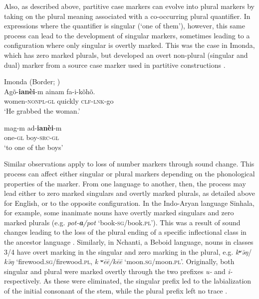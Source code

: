 \documentclass[output=paper]{langsci/langscibook}
\begin{document}
Also, as described above, partitive case markers can evolve into plural markers by
taking on the plural meaning associated with a co-occurring plural
quantifier. In expressions where the quantifier is singular (`one of
them'), however, this same process can lead to the development of
singular markers, sometimes leading to a configuration where only singular
is overtly marked. This was the case in Imonda, which has zero marked plurals, but developed
an overt non-plural
(singular and dual) marker
 from a source case marker used in partitive constructions .

\ea\label{imonda2}
Imonda (Border; )\\
\ea
\gll Agõ-\textbf{{ianèi}}-m ainam fa-i-kõhõ.\\
women-\textsc{nonpl-gl} quickly \textsc{clf-lnk}-go\\
\glt `He grabbed the woman.' 

\ex
\gll mag-m ad-\textbf{{ianèi}}-m \\
one-\textsc{gl} boy-\textsc{src-gl} \\
\glt `to one of the boys'


\z
\z


Similar observations apply to loss of number markers through sound
change. This process can affect
either singular or plural markers depending on the phonological
properties of the marker. From one language to another, then, the process may lead either to  zero marked singulars and
overtly marked plurals, as detailed above for
English, or to the opposite configuration. In the
Indo-Aryan language Sinhala,  for example, some inanimate nouns have
overtly marked singulars and
zero marked plurals
 (e.g. {\em pot-\textbf{\textit {a}}/pot} `book-\textsc{sg}/book.\textsc{pl}'). This was a result of
 sound changes leading to the loss of the plural ending of a specific inflectional class in the ancestor language
 \citep[250--256]{NitzNordhoff2010}. Similarly, in Nchanti, a Beboid
 language, nouns in classes 3/4 have overt
  marking in the singular and zero marking in the plural, e.g. {\em
    k{\bf ʷ}\=əŋ}/{\em
    k\=əŋ} `firewood.\textsc{sg}/firewood.\textsc{pl}, {\em k{\bf
      ʷ}ēē/kēē} `moon.\textsc{sg}/moon.\textsc{pl}'.
  Originally, both singular and plural were marked overtly through the
  two prefixes {\em *u-} and {\em *i-} respectively. As these were
  eliminated, the singular prefix led to the labialization of the
  initial consonant of the stem, while the plural prefix left no trace
  \citep{Hombert1980}.
\end{document}

